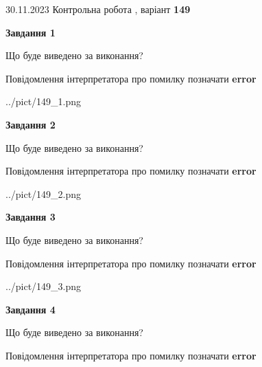 \documentclass[12pt, ukrainian]{article}
\begin{document}
{{30.11.2023 Контрольна робота , варіант  \No \textbf { 149 }\par}}
{




{\begin {center}\textbf{Завдання 1}\end {center}}\par
Що буде виведено за виконання? \par
Повідомлення інтерпретатора про помилку позначати \textbf{error}

\begin{center}
	{../pict/149_1.png}
\end{center}
\newpage

{\begin {center}\textbf{Завдання 2}\end {center}}\par
Що буде виведено за виконання? \par
Повідомлення інтерпретатора про помилку позначати \textbf{error}

\begin{center}
	{../pict/149_2.png}
\end{center}
\newpage

{\begin {center}\textbf{Завдання 3}\end {center}}\par
Що буде виведено за виконання? \par
Повідомлення інтерпретатора про помилку позначати \textbf{error}

\begin{center}
	{../pict/149_3.png}
\end{center}
\newpage

{\begin {center}\textbf{Завдання 4}\end {center}}\par
Що буде виведено за виконання? \par
Повідомлення інтерпретатора про помилку позначати \textbf{error}

}
\end{document}
